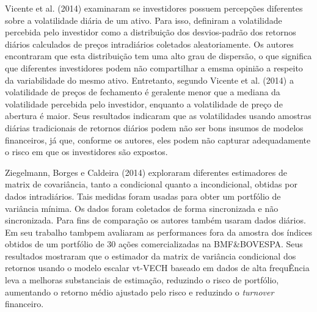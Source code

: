 \documentclass[]{article}
\begin{document}
Vicente et al. (2014) examinaram se investidores possuem percepções
diferentes sobre a volatilidade diária de um ativo. Para isso, definiram
a volatilidade percebida pelo investidor como a distribuição dos
desvios-padrão dos retornos diários calculados de preços intradiários
coletados aleatoriamente. Os autores encontraram que esta distribuição
tem uma alto grau de dispersão, o que significa que diferentes
investidores podem não compartilhar a emsma opinião a respeito da
variabilidade do mesmo ativo. Entretanto, segundo Vicente et al. (2014)
a volatilidade de preços de fechamento é geralente menor que a mediana
da volatilidade percebida pelo investidor, enquanto a volatilidade de
preço de abertura é maior. Seus resultados indicaram que as
volatilidades usando amostras diárias tradicionais de retornos diários
podem não ser bons insumos de modelos financeiros, já que, conforme os
autores, eles podem não capturar adequadamente o risco em que os
investidores são expostos.

Ziegelmann, Borges e Caldeira (2014) exploraram diferentes estimadores
de matrix de covariância, tanto a condicional quanto a incondicional,
obtidas por dados intradiários. Tais medidas foram usadas para obter um
portfólio de variância mínima. Os dados foram coletados de forma
sincronizada e não sincronizada. Para fins de comparação os autores
também usaram dados diários. Em seu trabalho tambpem avaliaram as
performances fora da amostra dos índices obtidos de um portfólio de 30
ações comercializadas na BMF\&BOVESPA. Seus resultados mostraram que o
estimador da matrix de variância condicional dos retornos usando o
modelo escalar vt-VECH baseado em dados de alta frequÊncia leva a
melhoras substanciais de estimação, reduzindo o risco de portfólio,
aumentando o retorno médio ajustado pelo risco e reduzindo o
\emph{turnover} financeiro.
\end{document}
